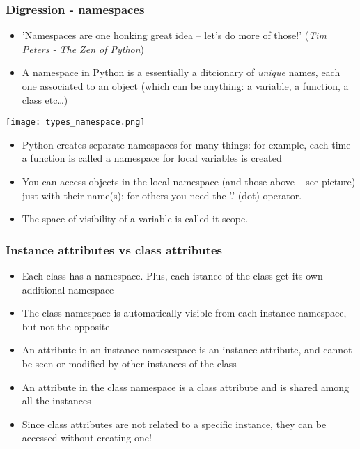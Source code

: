 \documentclass[9pt]{beamer}
\begin{document}
\begin{frame}
  \frametitle{Digression - namespaces}
  
  \begin{itemize}
    \small
    \item 'Namespaces are one honking great idea -- let's do more of those!'
            (\emph{Tim Peters - The Zen of Python})
    \medskip
    \item A \alert{namespace} in Python is a essentially a ditcionary of \emph{unique} names, each one associated to an object (which can be anything: a variable, a function, a class etc\dots)
    \medskip
  \end{itemize}
  
  \centering\texttt{[image: types\_namespace.png]}
  
  \begin{itemize}
    \small
    \item Python creates separate namespaces for many things: for example, each time a function is called a namespace for local variables is created
    \medskip 
    \item You can access objects in the local namespace (and those above -- 
          see picture) just with their name(s); for others you need
          the '.' (dot) operator.
    \medskip
    \item The space of visibility of a variable is called it \alert{scope}.
  \end{itemize}
  
\end{frame}


\begin{frame}
  \frametitle{Instance attributes vs class attributes}
  
  \begin{itemize}
    \small
    \item Each class has a namespace. Plus, each istance of the class get its own additional namespace
    \medskip
    \item The class namespace is automatically visible from each instance namespace, but not the opposite
    \medskip
    \item An attribute in an instance namesespace is an \alert{instance attribute}, and cannot be seen or modified
          by other instances of the class
    \medskip
    \item An attribute in the class namespace is a \alert{class attribute} and is shared among all the instances
    \medskip
    \item Since class attributes are not related to a specific instance, they can be accessed without creating one!
  \end{itemize}
  
\end{frame}
\end{document}
